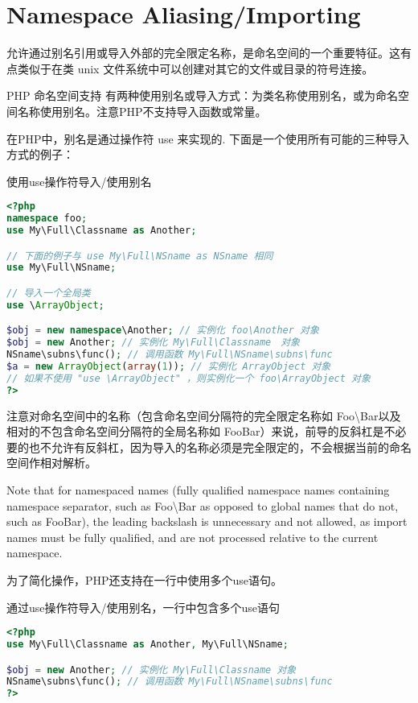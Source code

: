\chapter{Namespace Aliasing/Importing}

允许通过别名引用或导入外部的完全限定名称，是命名空间的一个重要特征。这有点类似于在类 unix 文件系统中可以创建对其它的文件或目录的符号连接。

PHP 命名空间支持 有两种使用别名或导入方式：为类名称使用别名，或为命名空间名称使用别名。注意PHP不支持导入函数或常量。

在PHP中，别名是通过操作符 use 来实现的. 下面是一个使用所有可能的三种导入方式的例子：


\begin{example}
使用use操作符导入/使用别名
\begin{lstlisting}[language=PHP]
<?php
namespace foo;
use My\Full\Classname as Another;

// 下面的例子与 use My\Full\NSname as NSname 相同
use My\Full\NSname;

// 导入一个全局类
use \ArrayObject;

$obj = new namespace\Another; // 实例化 foo\Another 对象
$obj = new Another; // 实例化 My\Full\Classname　对象
NSname\subns\func(); // 调用函数 My\Full\NSname\subns\func
$a = new ArrayObject(array(1)); // 实例化 ArrayObject 对象
// 如果不使用 "use \ArrayObject" ，则实例化一个 foo\ArrayObject 对象
?>
\end{lstlisting}
\end{example}

注意对命名空间中的名称（包含命名空间分隔符的完全限定名称如 Foo\textbackslash Bar以及相对的不包含命名空间分隔符的全局名称如 FooBar）来说，前导的反斜杠是不必要的也不允许有反斜杠，因为导入的名称必须是完全限定的，不会根据当前的命名空间作相对解析。 

Note that for namespaced names (fully qualified namespace names containing namespace separator, such as Foo\textbackslash Bar as opposed to global names that do not, such as FooBar), the leading backslash is unnecessary and not allowed, as import names must be fully qualified, and are not processed relative to the current namespace.

为了简化操作，PHP还支持在一行中使用多个use语句。

\begin{example}
通过use操作符导入/使用别名，一行中包含多个use语句
\begin{lstlisting}[language=PHP]
<?php
use My\Full\Classname as Another, My\Full\NSname;

$obj = new Another; // 实例化 My\Full\Classname 对象
NSname\subns\func(); // 调用函数 My\Full\NSname\subns\func
?>
\end{lstlisting}
\end{example}

